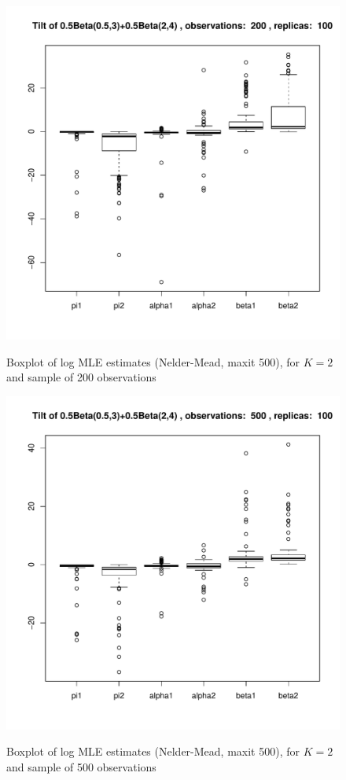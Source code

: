\documentclass[10pt]{report}
\begin{document}
\begin{figure}[h]
\centering
\includegraphics[width=\textwidth]{../img/p05_a05_b3_p05_a2_b4/tilted/K2/bxplots/n200_R100.pdf}
\label{fig:TBD4}
\caption{Boxplot of log MLE estimates (Nelder-Mead, maxit 500), for $K=2$ and sample of 200 observations}
\end{figure}

\begin{figure}[h]
\centering
\includegraphics[width=\textwidth]{../img/p05_a05_b3_p05_a2_b4/tilted/K2/bxplots/n500_R100.pdf}
\label{fig:TBD5}
\caption{Boxplot of log MLE estimates (Nelder-Mead, maxit 500), for $K=2$ and sample of 500 observations}
\end{figure}
\end{document}

